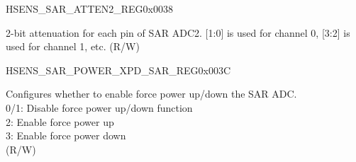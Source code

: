 \begin{register}{H}{SENS\_SAR\_ATTEN2\_REG}{0x{}0038}\label{regdesc:SENSSARATTEN2REG}
%
\regnewline%
\begin{regdesc}\begin{reglist}
\label{fielddesc:SENSSAR2ATTEN}\item [SENS\_SAR2\_ATTEN] 2-bit attenuation for each pin of SAR ADC2. [1:0] is used for channel 0, [3:2] is used for channel 1, etc. (R/W)
\end{reglist}\end{regdesc}
\end{register}


\begin{register}{H}{SENS\_SAR\_POWER\_XPD\_SAR\_REG}{0x{}003C}\label{regdesc:SENSSARPOWERXPDSARREG}
%
%
%
\regnewline%
\begin{regdesc}\begin{reglist}
\label{fielddesc:SENSFORCEXPDSAR}\item [SENS\_FORCE\_XPD\_SAR] Configures whether to enable force power up/down the SAR ADC. \\
0/1: Disable force power up/down function\\
2: Enable force power up\\
3: Enable force power down\\
(R/W)
\end{reglist}\end{regdesc}
\end{register}









